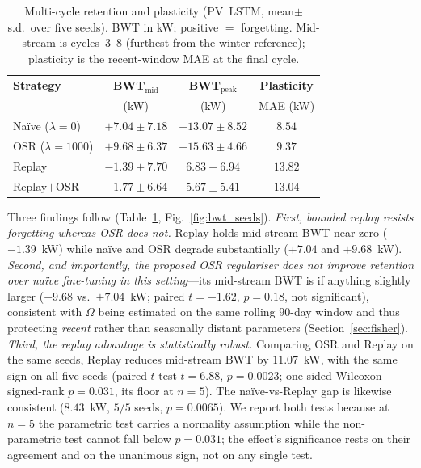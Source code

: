 \documentclass[journal]{IEEEtran}
\begin{document}
\begin{table}[t]
\centering
\caption{Multi-cycle retention and plasticity (PV~LSTM, mean$\pm$s.d.\ over
five seeds). BWT in kW; positive $=$ forgetting. Mid-stream is cycles~3--8
(furthest from the winter reference); plasticity is the recent-window MAE at
the final cycle.}
\label{tab:multicycle}
\begin{tabular}{@{}lccc@{}}
\toprule
\textbf{Strategy} & \textbf{BWT$_{\mathrm{mid}}$} & \textbf{BWT$_{\mathrm{peak}}$}
& \textbf{Plasticity} \\
& (kW) & (kW) & MAE (kW) \\
\midrule
Na\"ive ($\lambda{=}0$)      & $+7.04\pm7.18$ & $+13.07\pm8.52$ & $8.54$ \\
OSR ($\lambda{=}1000$)       & $+9.68\pm6.37$ & $+15.63\pm4.66$ & $9.37$ \\
Replay                        & $\mathbf{-1.39\pm7.70}$ & $\mathbf{6.83\pm6.94}$ & $13.82$ \\
Replay${+}$OSR                & $\mathbf{-1.77\pm6.64}$ & $\mathbf{5.67\pm5.41}$ & $13.04$ \\
\bottomrule
\end{tabular}
\end{table}

Three findings follow (Table~\ref{tab:multicycle}, Fig.~\ref{fig:bwt_seeds}).
\emph{First, bounded replay resists forgetting whereas OSR does not.} Replay
holds mid-stream BWT near zero ($-1.39$~kW) while na\"ive and OSR degrade
substantially ($+7.04$ and $+9.68$~kW). \emph{Second, and importantly, the
proposed OSR regulariser does not improve retention over na\"ive fine-tuning
in this setting}---its mid-stream BWT is if anything slightly larger
($+9.68$ vs.\ $+7.04$~kW; paired $t=-1.62$, $p=0.18$, not significant),
consistent with $\Omega$ being estimated on the same rolling $90$-day window
and thus protecting \emph{recent} rather than seasonally distant parameters
(Section~\ref{sec:fisher}). \emph{Third, the replay advantage is
statistically robust.} Comparing OSR and Replay on the same seeds, Replay
reduces mid-stream BWT by $11.07$~kW, with the same sign on all five seeds
(paired $t$-test $t=6.88$, $p=0.0023$; one-sided Wilcoxon signed-rank
$p=0.031$, its floor at $n{=}5$). The na\"ive-vs-Replay gap is likewise
consistent ($8.43$~kW, $5/5$ seeds, $p=0.0065$). We report both tests because
at $n{=}5$ the parametric test carries a normality assumption while the
non-parametric test cannot fall below $p=0.031$; the effect's significance
rests on their agreement and on the unanimous sign, not on any single test.
\end{document}
